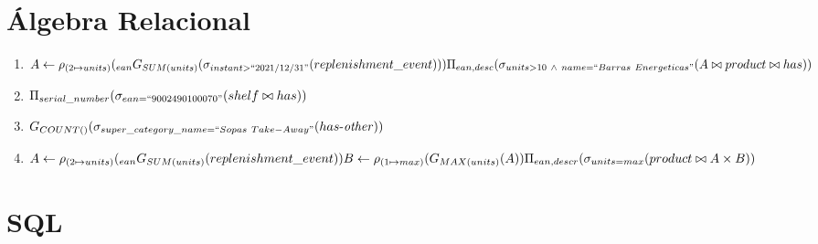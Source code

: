 \documentclass{article}
\newcommand{\select}{\sigma}
\newcommand{\project}{\Pi}
\newcommand{\njoin}{\bowtie}
\newcommand{\rename}{\rho}
\newcommand{\aggregatefn}{\mbox{$G$}}
\begin{document}
	\pagebreak

	\section*{Álgebra Relacional}

	\newcommand\responsiblefor{\mathop{\mbox{$responsible$-$\mathit{for}$}}}
	\newcommand\hasother{\mathop{\mbox{$has$-$\mathit{other}$}}}

	\begin{enumerate}[label=\arabic*)]

		\item $A \leftarrow \rename_{(2 \mapsto units)}(_{ean} \aggregatefn_{SUM(units)}(\select_{instant > ``2021/12/31"}(replenishment\_event)))\\
			\project_{ean, desc}(\select_{units > 10\ \wedge\ name = ``Barras\ Energeticas"}(A \njoin product \njoin has))$

		\item $\project_{serial\_number}(\select_{ean = ``9002490100070"}(shelf \njoin has))$

		\item $\aggregatefn_{COUNT()}(\select_{super\_category\_name = ``Sopas\ Take-Away"}(\hasother))$

		\item $A \leftarrow \rename_{(2 \mapsto units)}(_{ean}\aggregatefn_{SUM(units)}(replenishment\_event))\\
			   B \leftarrow \rename_{(1 \mapsto max)}(\aggregatefn_{MAX(units)}(A))\\
			   \project_{ean, descr}(\select_{units=max}(product \njoin A \times B))$

	\end{enumerate}

	\vspace{5mm}

	\section*{SQL}
\end{document}
